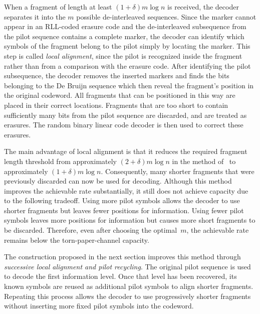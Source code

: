 \documentclass[journal,letterpaper,onecolumn,11pt]{IEEEtran}
\begin{document}
When a fragment of length at least $(1+\delta)m\log n$ is received, the decoder separates it into the $m$ possible de-interleaved sequences. 
Since the marker cannot appear in an RLL-coded erasure code and the de-interleaved subsequence from the pilot sequence contains a complete marker, the decoder can identify which symbols of the fragment belong to the pilot simply by locating the marker. 
This step is called \emph{local alignment}, since the pilot is recognized inside the fragment rather than from a comparison with the erasure code.
After identifying the pilot subsequence, the decoder removes the inserted markers and finds the bits belonging to the De Bruijn sequence which then reveal the fragment's position in the original codeword. 
All fragments that can be positioned in this way are placed in their correct locations. 
Fragments that are too short to contain sufficiently many bits from the  pilot sequence are discarded, and are treated as erasures. 
The random binary linear code decoder is then used to correct these erasures.

The main advantage of local alignment is that it reduces the required fragment length threshold from approximately $(2+\delta)m\log n$ in the method of~\cite{shomorony2021torn} to approximately $(1+\delta)m\log n$. 
Consequently, many shorter fragments that were previously discarded can now be used for decoding. 
Although this method improves the achievable rate substantially, it still does not achieve capacity due to the following tradeoff. 
Using more pilot symbols allows the decoder to use shorter fragments but leaves fewer positions for information. 
Using fewer pilot symbols leaves more positions for information but causes more short fragments to be discarded. Therefore, even after choosing the optimal~$m$, the achievable rate remains below the torn-paper-channel capacity.

The construction proposed in the next section improves this method through \emph{successive local alignment and pilot recycling}. The original pilot sequence is used to decode the first information level.
Once that level has been recovered, its known symbols are reused as additional pilot symbols to align shorter fragments. 
Repeating this process allows the decoder to use progressively shorter fragments without inserting more fixed pilot symbols into the codeword.
\end{document}
